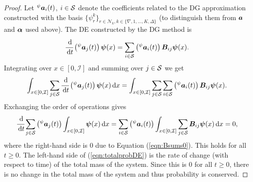 \begin{proof}
Let \( {}^\psi \boldsymbol a_i(t)\), \(i\in\mathcal{S}\) denote the coefficients related to the DG approximation constructed with the basis \(\{\psi_r^k\}_{r\in\mathcal N_k,k\in\{\nabla,1,...,K,\Delta\}}\) (to distinguish them from \(\boldsymbol a\) and \(\boldsymbol \alpha\) used above). The DE constructed by the DG method is
\begin{align*}
	\cfrac{\, \mathrm{d}}{\, \mathrm{d} t}\left({}^\psi \boldsymbol a_j (t)\right)\boldsymbol \psi(x) = \sum_{i\in\mathcal{S}}\left({}^\psi \boldsymbol a_i (t)\right)\boldsymbol B_{ij}\boldsymbol\psi(x).
\end{align*}
Integrating over \(x\in [0,\mathcal I]\) and summing over \(j\in\mathcal{S}\) we get
\begin{align*}
	\int_{x\in[0,\mathcal I]}\sum_{j\in\mathcal{S}}\cfrac{\, \mathrm{d}}{\, \mathrm{d} t}\left({}^\psi \boldsymbol a_j (t)\right)\boldsymbol \psi(x)\, \mathrm{d} x = \int_{x\in[0,\mathcal I]}\sum_{j\in\mathcal{S}}\sum_{i\in\mathcal{S}}\left({}^\psi \boldsymbol a_i (t)\right)\boldsymbol B_{ij}\boldsymbol\psi(x).
\end{align*}
Exchanging the order of operations gives 
\begin{align}\label{eqn:totalprobDE}
	\cfrac{\, \mathrm{d}}{\, \mathrm{d} t}\sum_{j\in\mathcal{S}} \left({}^\psi \boldsymbol a_j (t)\right)\int_{x\in[0,\mathcal I]} \boldsymbol \psi(x)\, \mathrm{d} x =  \sum_{i\in\mathcal{S}}\left({}^\psi \boldsymbol a_i (t)\right)\int_{x\in[0,\mathcal I]}\sum_{j\in\mathcal{S}}\boldsymbol B_{ij}\boldsymbol\psi(x)\, \mathrm{d} x = 0,
\end{align}
where the right-hand side is \(0\) due to Equation (\ref{eqn:Bsums0}). This holds for all \(t\geq 0\). The left-hand side of (\ref{eqn:totalprobDE}) is the rate of change (with respect to time) of the total mass of the system. Since this is \( 0\) for all \(t\geq 0\), there is no change in the total mass of the system and thus probability is conserved. 
\end{proof}
